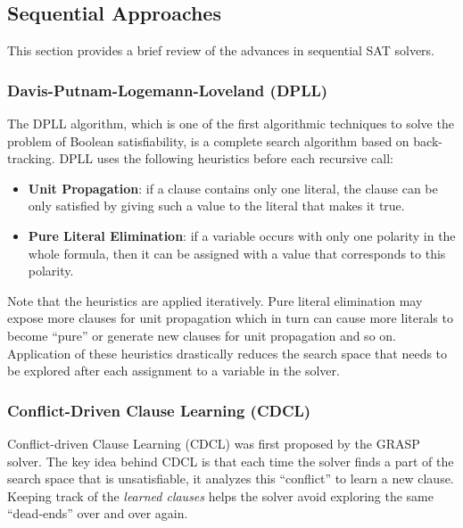 \documentclass[letterpaper, compsoc, conference]{IEEEtran}
\begin{document}
\subsection{Sequential Approaches}

This section provides a brief review of the advances in sequential SAT solvers.

\subsubsection{Davis-Putnam-Logemann-Loveland (DPLL)}

The DPLL algorithm, which is one of the first algorithmic techniques to solve
the problem of Boolean satisfiability, is a complete search algorithm based on
back-tracking. DPLL uses the following heuristics before each recursive call:

\begin{itemize}
\item \textbf{Unit Propagation}: if a clause contains only one literal, the clause 
can be only satisfied by giving such a value to the literal that makes it true. 

\item \textbf{Pure Literal Elimination}: if a variable occurs with only one
polarity in the whole formula, then it can be assigned with a value that
corresponds to this polarity.
\end{itemize}

Note that the heuristics are applied iteratively. Pure literal elimination may
expose more clauses for unit propagation which in turn can cause more literals
to become ``pure'' or generate new clauses for unit propagation and so on.
Application of these heuristics drastically reduces the search space that needs
to be explored after each assignment to a variable in the solver.

\subsubsection{Conflict-Driven Clause Learning (CDCL)}

Conflict-driven Clause Learning (CDCL) was first proposed by the
GRASP~\cite{Silva1997GRASP} solver. The key idea behind CDCL is that each time the
solver finds a part of the search space that is unsatisfiable, it analyzes this
``conflict'' to learn a new clause. Keeping track of the \emph{learned clauses}
helps the solver avoid exploring the same ``dead-ends'' over and over again.
\end{document}

